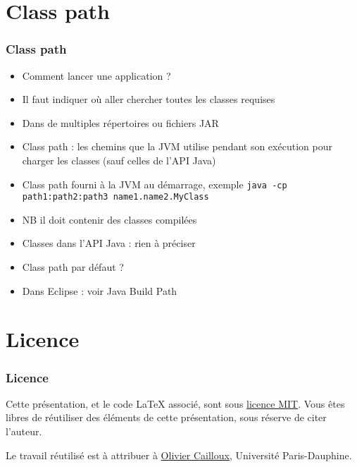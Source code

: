 \documentclass[english, french]{beamer}
\begin{document}
\section{Class path}
\begin{frame}
	\frametitle{Class path}
	\begin{itemize}
		\item Comment lancer une application ?
		\item Il faut indiquer où aller chercher toutes les classes requises
		\item Dans de multiples répertoires ou fichiers JAR
		\item Class path : les chemins que la JVM utilise pendant son exécution pour charger les classes {\tiny (sauf celles de l’API Java)}
		\item Class path fourni à la JVM au démarrage, exemple \texttt{java -cp path1:path2:path3 name1.name2.MyClass}
		\item NB il doit contenir des classes compilées
		\item Classes dans l’API Java : rien à préciser
		\item Class path par défaut ? \onslide<2->{"\texttt{.}"}
		\item Dans Eclipse : voir Java Build Path
	\end{itemize}
\end{frame}

\appendix

\section{Licence}
\begin{frame}
	\frametitle{Licence}
	Cette présentation, et le code LaTeX associé, sont sous \href{https://opensource.org/licenses/MIT}{licence MIT}. Vous êtes libres de réutiliser des éléments de cette présentation, sous réserve de citer l’auteur.
	
	Le travail réutilisé est à attribuer à \href{https://www.lamsade.dauphine.fr/~ocailloux/}{Olivier Cailloux}, Université Paris-Dauphine.
\end{frame}
\end{document}
